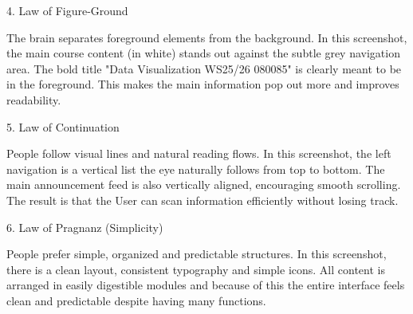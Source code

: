 \begin{exercise}
\begin{itemize}
        4. Law of Figure-Ground 

        The brain separates foreground elements from the background.
        In this screenshot, the main course content (in white) stands out against
        the subtle grey navigation area.
        The bold title "Data Visualization WS25/26 080085" is clearly meant to be in the foreground.
        This makes the main information pop out more and improves readability.

        5. Law of Continuation

        People follow visual lines and natural reading flows.
        In this screenshot, the left navigation is a vertical list the eye naturally
        follows from top to bottom.
        The main announcement feed is also vertically aligned, encouraging smooth scrolling.
        The result is that the User can scan information efficiently without losing track.

        6. Law of Pragnanz (Simplicity)
        
        People prefer simple, organized and predictable structures.
        In this screenshot, there is a clean layout, consistent typography and simple icons.
        All content is arranged in easily digestible modules and because of this the entire interface feels 
        clean and predictable despite having many functions.
        \end{itemize}
    \end{exercise}

